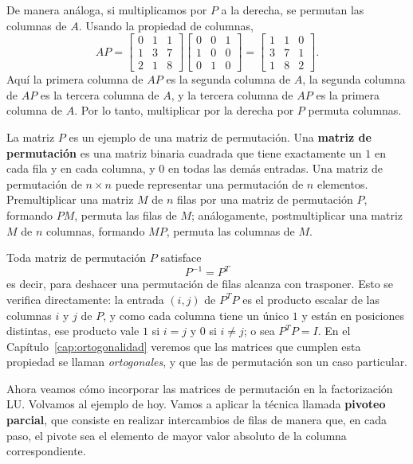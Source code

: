 De manera análoga, si multiplicamos por $P$ a la derecha, se permutan las columnas de $A$. Usando la propiedad de columnas,
\[
AP =
\begin{bmatrix}
0 & 1 & 1 \\
1 & 3 & 7 \\
2 & 1 & 8
\end{bmatrix}
\begin{bmatrix}
0 & 0 & 1 \\
1 & 0 & 0 \\
0 & 1 & 0
\end{bmatrix}
=
\begin{bmatrix}
1 & 1 & 0 \\
3 & 7 & 1 \\
1 & 8 & 2
\end{bmatrix}.
\]
Aquí la primera columna de $AP$ es la segunda columna de $A$, la segunda columna de $AP$ es la tercera columna de $A$, y la tercera columna de $AP$ es la primera columna de $A$. Por lo tanto, multiplicar por la derecha por $P$ permuta columnas.

La matriz $P$ es un ejemplo de una matriz de permutación. Una \textbf{matriz de permutación} es una matriz binaria cuadrada que tiene exactamente un $1$ en cada fila y en cada columna, y $0$ en todas las demás entradas. Una matriz de permutación de $n\times n$ puede representar una permutación de $n$ elementos. Premultiplicar una matriz $M$ de $n$ filas por una matriz de permutación $P$, formando $PM$, permuta las filas de $M$; análogamente, postmultiplicar una matriz $M$ de $n$ columnas, formando $MP$, permuta las columnas de $M$.

Toda matriz de permutación $P$ satisface
\[
\boxed{\ P^{-1} = P^{T}\ }
\]
es decir, para deshacer una permutación de filas alcanza con trasponer. Esto se
verifica directamente: la entrada $(i,j)$ de $P^TP$ es el producto escalar de
las columnas $i$ y $j$ de $P$, y como cada columna tiene un único $1$ y están
en posiciones distintas, ese producto vale $1$ si $i=j$ y $0$ si $i\neq j$; o
sea $P^TP=I$. En el Capítulo~\ref{cap:ortogonalidad} veremos que las matrices
que cumplen esta propiedad se llaman \emph{ortogonales}, y que las de
permutación son un caso particular.





Ahora veamos cómo incorporar las matrices de permutación en la factorización LU. Volvamos al ejemplo de hoy. Vamos a aplicar la técnica llamada \textbf{pivoteo parcial}, que consiste en realizar intercambios de filas de manera que, en cada paso, el pivote sea el elemento de mayor valor absoluto de la columna correspondiente.

